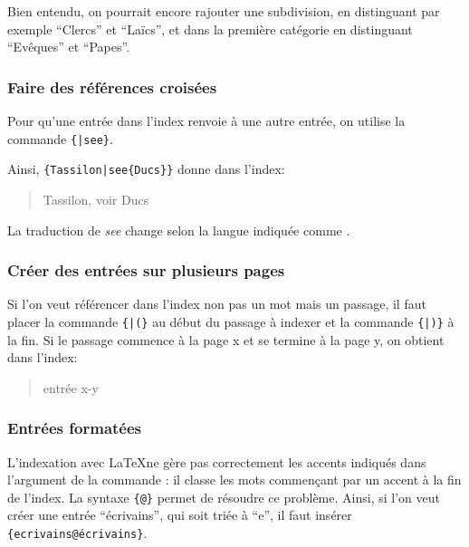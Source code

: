 Bien entendu, on pourrait encore rajouter une subdivision, en distinguant par exemple \enquote{Clercs} et \enquote{Laïcs}, et dans la première catégorie en distinguant \enquote{Evêques} et \enquote{Papes}. 


 
\subsubsection{Faire des références croisées}

Pour qu'une entrée dans l'index renvoie à une autre entrée, on utilise la commande  \verb|{|\verb+|see+\verb|}|. 

Ainsi,  \verb+{Tassilon|see{Ducs}}+ donne dans l'index:

\begin{quotation}
Tassilon, voir Ducs
\end{quotation}
La traduction de \emph{see} change selon la langue indiquée comme . 



  

\subsubsection{Créer des entrées sur plusieurs pages}

Si l'on veut référencer dans l'index non pas un mot mais un passage, il faut placer la commande \verb|{|\verb+|(}+ au début du passage à indexer et la commande  \verb|{|\verb+|)}+ à la fin. Si le passage commence à la page x et se termine à la page y, on obtient dans l'index: 

\begin{quotation}
entrée x-y
\end{quotation}


\subsubsection{Entrées formatées}

L'indexation avec \LaTeX ne gère pas correctement les accents indiqués dans l'argument de la commande  : il classe les mots commençant par un accent à la fin de l'index. La syntaxe \verb|{|\verb|@|\verb+}+ permet de résoudre ce problème. Ainsi, si l'on veut créer une entrée \enquote{écrivains}, qui soit triée à \enquote{e}, il faut insérer \verb|{ecrivains@écrivains}|.

